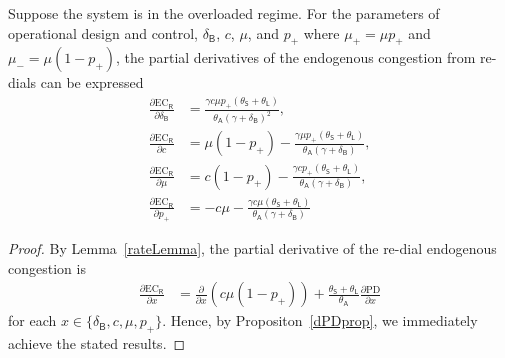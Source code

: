 \documentclass[manuscript,screen,authorversion]{acmart}
\begin{document}
\begin{proposition}\label{dECRprop}
Suppose the system is in the overloaded regime. For the parameters of operational design and control, $\delta_\mathsf{B}$, $c$, $\mu$, and $p_+$ where $\mu_+ = \mu p_+$ and $\mu_- = \mu(1-p_+)$, the partial derivatives of the endogenous congestion from re-dials can be expressed
\begin{align}
\frac{\partial \mathrm{EC}_\mathsf{R}}{\partial \delta_\mathsf{B}}
&=
\frac{\gamma c\mu p_+ (\theta_\mathsf{S} + \theta_\mathsf{L}) }{\theta_\mathsf{A}(\gamma + \delta_\mathsf{B})^2}
,
\\
\frac{\partial \mathrm{EC}_\mathsf{R}}{\partial c}
&=
 \mu (1-p_+)
-
\frac{\gamma \mu p_+ (\theta_\mathsf{S} + \theta_\mathsf{L}) }
{\theta_\mathsf{A}(\gamma + \delta_\mathsf{B})}
,
\\
\frac{\partial \mathrm{EC}_\mathsf{R}}{\partial \mu}
&=
c (1-p_+)
-
\frac{\gamma c p_+ (\theta_\mathsf{S} + \theta_\mathsf{L}) }
{\theta_\mathsf{A}(\gamma + \delta_\mathsf{B})}
,
\\
\frac{\partial \mathrm{EC}_\mathsf{R}}{\partial p_+}
&=
-c \mu 
-
\frac{\gamma c \mu (\theta_\mathsf{S} + \theta_\mathsf{L}) }
{\theta_\mathsf{A}(\gamma + \delta_\mathsf{B})}
\end{align}
\end{proposition}
\begin{proof}
By Lemma~\ref{rateLemma}, the partial derivative of the re-dial endogenous congestion is
\begin{align}
\frac{\partial \mathrm{EC}_\mathsf{R}}{\partial x}
&=
\frac{\partial}{\partial x}\left(c \mu (1-p_+)\right)
+
\frac{\theta_\mathsf{S} + \theta_\mathsf{L}}{\theta_\mathsf{A}}
\frac{\partial \mathrm{PD}}{\partial x}
\end{align}
for each $x \in \{\delta_\mathsf{B}, c, \mu, p_+\}$. Hence, by Propositon~\ref{dPDprop}, we immediately achieve the stated results.
\end{proof}
\end{document}
